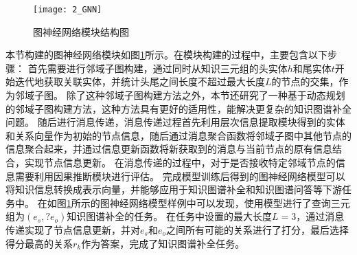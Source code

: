 \documentclass[algorithmlist, AutoFakeBold, AutoFakeSlant, figurelist, tablelist, nomlist, engineering]{seuthesix}
\begin{document}
\begin{figure}
  \centering
  \texttt{[image: 2\_GNN]}
  \caption{图神经网络模块结构图}
  \label{2_GNN}
\end{figure}
本节构建的图神经网络模块如图\ref{2_GNN}所示。在模块构建的过程中，主要包含以下步骤：
首先需要进行邻域子图构建，通过同时从知识三元组的头实体$h$和尾实体$t$开始迭代地获取关联实体，并统计头尾之间长度不超过最大长度$L$的节点的交集，作为邻域子图。
除了这种邻域子图构建方法之外，本节还研究了一种基于动态规划的邻域子图构建方法，这种方法具有更好的适用性，能解决更复杂的知识图谱补全问题。
随后进行消息传递，消息传递过程首先利用层次信息提取模块得到的实体和关系向量作为初始的节点信息，随后通过消息聚合函数将邻域子图中其他节点的信息聚合起来，并通过信息更新函数将新获取到的消息与当前节点的原有信息结合，实现节点信息更新。
在消息传递的过程中，对于是否接收特定邻域节点的信息需要利用因果推断模块进行评估。
完成模型训练后得到的图神经网络模型可以将知识信息转换成表示向量，并能够应用于知识图谱补全和知识图谱问答等下游任务中。
在如图\ref{2_GNN}所示的图神经网络模型样例中可以发现，使用模型进行了查询三元组为$(e_s, ? e_o)$知识图谱补全的任务。
在任务中设置的最大长度$L=3$，通过消息传递实现了节点信息更新，并对$e_s$和$e_o$之间所有可能的关系进行了打分，最后选择得分最高的关系$r_k$作为答案，完成了知识图谱补全任务。
\end{document}
